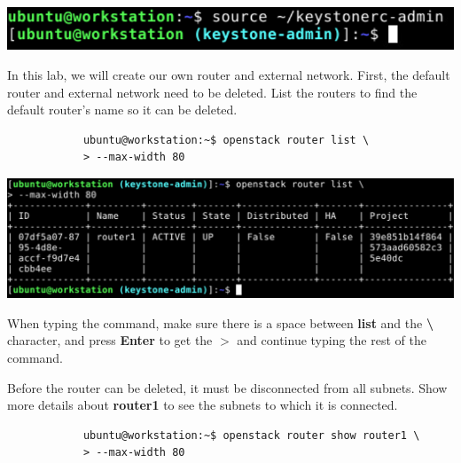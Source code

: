 \documentclass[letterpaper, 12pt]{article}
\begin{document}
\begin{enumerate}
\begin{labstep}
        \begin{center}
            \includegraphics[width=\linewidth]{images/part1/step3.png}
        \end{center}
    \end{labstep}

    \begin{labstep}
        In this lab, we will create our own router and external network.
        First, the default router and external network need to be deleted.
        List the routers to find the default router's name so it can be deleted.
        \begin{lstlisting}
            ubuntu@workstation:~$ openstack router list \
            > --max-width 80
        \end{lstlisting}

        \begin{center}
            \includegraphics[width=\linewidth]{images/part1/step4.png}
        \end{center}
    \end{labstep}

    \begin{tipbox}
        When typing the command, make sure there is a space between \textbf{list} and the \textbf{\textbackslash} character, and press \textbf{Enter} to get the \textbf{$>$} and continue typing the rest of the command.
    \end{tipbox}

    \begin{labstep}
        Before the router can be deleted, it must be disconnected from all subnets.
        Show more details about \textbf{router1} to see the subnets to which it is connected.
        \begin{lstlisting}
            ubuntu@workstation:~$ openstack router show router1 \
            > --max-width 80
        \end{lstlisting}


\end{labstep}
\end{enumerate}
\end{document}
